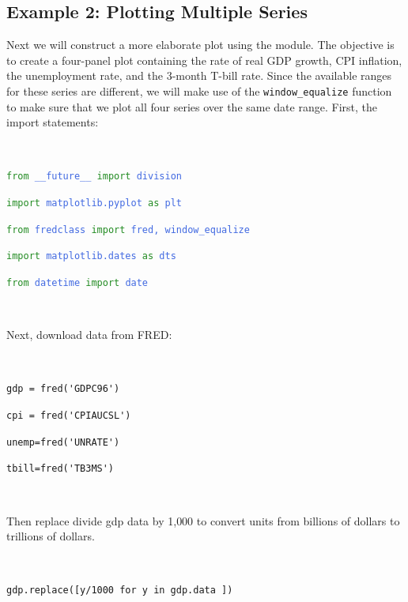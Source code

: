 \documentclass[11pt,fleqn]{article}
\newcommand{\ttt}{\texttt}
\newcommand{\tc}{\textcolor}
\begin{document}
\subsection{Example 2: Plotting Multiple Series}

Next we will construct a more elaborate plot using the module. The objective is to create a four-panel plot containing the rate of real GDP growth, CPI inflation, the unemployment rate, and the 3-month T-bill rate. Since the available ranges for these series are different, we will make use of the \verb!window_equalize! function to make sure that we plot all four series over the same date range. First, the import statements:

\

\begin{minipage}{6.5in}
\ttt{\tc{ForestGreen}{from} \tc{RoyalBlue}{\_\_future\_\_} \tc{ForestGreen}{import} \tc{RoyalBlue}{division}}

\ttt{\tc{ForestGreen}{import} \tc{RoyalBlue}{matplotlib.pyplot} \tc{ForestGreen}{as} \tc{RoyalBlue}{plt}}

\ttt{\tc{ForestGreen}{from} \tc{RoyalBlue}{fredclass} \tc{ForestGreen}{import} \tc{RoyalBlue}{fred, window\_equalize}}

\ttt{\tc{ForestGreen}{import} \tc{RoyalBlue}{matplotlib.dates} \tc{ForestGreen}{as} \tc{RoyalBlue}{dts}}

\ttt{\tc{ForestGreen}{from} \tc{RoyalBlue}{datetime} \tc{ForestGreen}{import} \tc{RoyalBlue}{date}}

\

\end{minipage}

\noindent Next, download data from FRED:

\

\begin{minipage}{6.5in}
\verb!gdp = fred('GDPC96')!

\verb!cpi = fred('CPIAUCSL')!

\verb!unemp=fred('UNRATE')!

\verb!tbill=fred('TB3MS')!

\

\end{minipage}

\noindent Then replace divide gdp data by 1{,}000 to convert units from billions of dollars to trillions of dollars.

\

\begin{minipage}{6.5in}

\ttt{gdp.replace([y/1000 for y in gdp.data ])}

\

\end{minipage}
\end{document}
